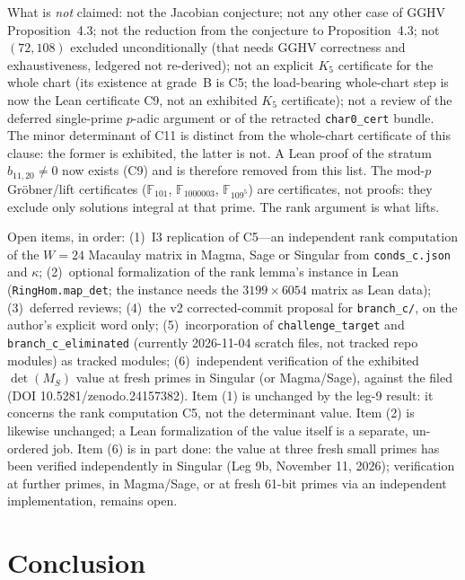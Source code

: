 \documentclass[a4paper,11pt]{article}
\newcommand{\filename}[1]{\texttt{\seqsplit{#1}}}
\theoremstyle{plain}
\theoremstyle{definition}
\theoremstyle{remark}
\begin{document}
What is \emph{not} claimed: not the Jacobian conjecture; not any other case of GGHV Proposition~4.3; not the reduction from the conjecture to Proposition~4.3; not $(72,108)$ excluded unconditionally (that needs GGHV correctness and exhaustiveness, ledgered not re-derived); not an explicit $K_5$ certificate for the whole chart (its existence at grade~B is C5; the load-bearing whole-chart step is now the Lean certificate C9, not an exhibited $K_5$ certificate); not a review of the deferred single-prime $p$-adic argument or of the retracted \texttt{char0\_cert} bundle. The minor determinant of C11 is distinct from the whole-chart certificate of this clause: the former is exhibited, the latter is not. A Lean proof of the stratum $b_{11,20}\ne0$ now exists (C9) and is therefore removed from this list. The mod-$p$ Gr\"obner/lift certificates ($\mathbb{F}_{101}$, $\mathbb{F}_{1000003}$, $\mathbb{F}_{109^5}$) are certificates, not proofs: they exclude only solutions integral at that prime. The rank argument is what lifts.

Open items, in order: (1)~I3 replication of C5---an independent rank computation of the $W=24$ Macaulay matrix in Magma, Sage or Singular from \texttt{conds\_c.json} and $\kappa$; (2)~optional formalization of the rank lemma's instance in Lean (\texttt{RingHom.map\_det}; the instance needs the $3199\times6054$ matrix as Lean data); (3)~deferred reviews; (4)~the v2 corrected-commit proposal for \texttt{branch\_c/}, on the author's explicit word only; (5)~incorporation of \texttt{challenge\_target} and \texttt{branch\_c\_eliminated} (currently 2026-11-04 scratch files, not tracked repo modules) as tracked modules; (6)~independent verification of the exhibited $\det(M_S)$ value at fresh primes in Singular (or Magma/Sage), against the filed \filename{gghv-dependency-closure/leg9/result.json} (DOI 10.5281/zenodo.24157382). Item (1) is unchanged by the leg-9 result: it concerns the rank computation C5, not the determinant value. Item (2) is likewise unchanged; a Lean formalization of the value itself is a separate, un-ordered job. Item (6) is in part done: the value at three fresh small primes has been verified independently in Singular (Leg 9b, November 11, 2026); verification at further primes, in Magma/Sage, or at fresh 61-bit primes via an independent implementation, remains open.

\section{Conclusion}\label{bc:sec:conclusion}
\end{document}
